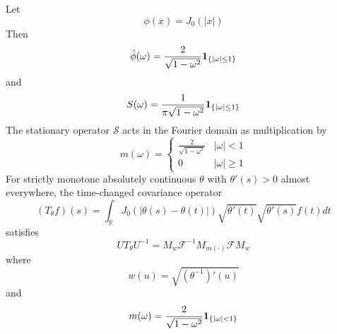 \documentclass{article}
\newcommand{\cdummy}{\cdot}
\newcommand{\tmtextbf}[1]{\text{{\bfseries{#1}}}}
\begin{document}
\begin{example}
  Let
  \begin{equation}
    \phi (x) = J_0 (|x|)
  \end{equation}
  Then
  \begin{equation}
    \hat{\phi} (\omega) = \frac{2}{\sqrt{1 - \omega^2}}
    \text{\tmtextbf{1}}_{\{| \omega | \le 1\}}
  \end{equation}
  and
  \begin{equation}
    S (\omega) = \frac{1}{\pi \sqrt{1 - \omega^2}} \text{\tmtextbf{1}}_{\{|
    \omega | \le 1\}}
  \end{equation}
  The stationary operator $\mathcal{S}$ acts in the Fourier domain as
  multiplication by
  \begin{equation}
    m (\omega) = \left\{ \begin{array}{ll}
      \frac{2}{\sqrt{1 - \omega^2}} & | \omega | < 1\\
      0 & | \omega | \geqslant 1
    \end{array} \right.
  \end{equation}
  For strictly monotone absolutely continuous $\theta$ with $\theta' (s) > 0$
  almost everywhere, the time-changed covariance operator
  \begin{equation}
    (T_{\theta} f) (s) = \int_{\mathbb{R}} J_0 (| \theta (s) - \theta (t) |)
    \sqrt{\theta' (t)}  \sqrt{\theta' (s)} f (t) dt
  \end{equation}
  satisfies
  \begin{equation}
    UT_{\theta} U^{- 1} = M_w \mathcal{F}^{- 1} M_{m (\cdummy)} \mathcal{F}M_w
  \end{equation}
  where
  \begin{equation}
    w (u) = \sqrt{(\theta^{- 1})' (u)}
  \end{equation}
  and
  \begin{equation}
    m (\omega) = \frac{2}{\sqrt{1 - \omega^2}} \text{\tmtextbf{1}}_{\{| \omega
    | < 1\}}
  \end{equation}
\end{example}
\end{document}
